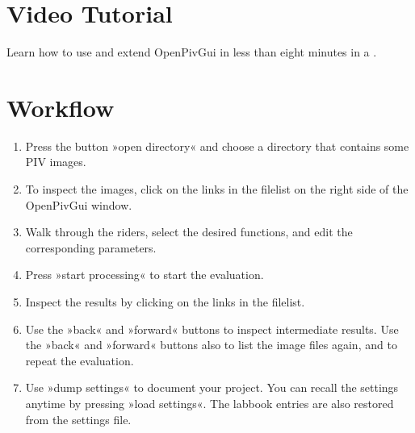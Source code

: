 \documentclass[letterpaper,10pt,english]{sphinxmanual}
\begin{document}
\section{Video Tutorial}
\label{\detokenize{usage:video-tutorial}}
Learn how to use and extend OpenPivGui in less than eight minutes in a .


\section{Workflow}
\label{\detokenize{usage:workflow}}\begin{enumerate}
%
\item {} 
Press the button »open directory« and choose a directory that contains some PIV images.

\item {} 
To inspect the images, click on the links in the file\sphinxhyphen{}list on the right side of the OpenPivGui window.

\item {} 
Walk through the riders, select the desired functions, and edit the corresponding parameters.

\item {} 
Press »start processing« to start the evaluation.

\item {} 
Inspect the results by clicking on the links in the file\sphinxhyphen{}list.

\item {} 
Use the »back« and »forward« buttons to inspect intermediate results. Use the »back« and »forward« buttons also to list the image files again, and to repeat the evaluation.

\item {} 
Use »dump settings« to document your project. You can recall the settings anytime by pressing »load settings«. The lab\sphinxhyphen{}book entries are also restored from the settings file.

\end{enumerate}
\end{document}
